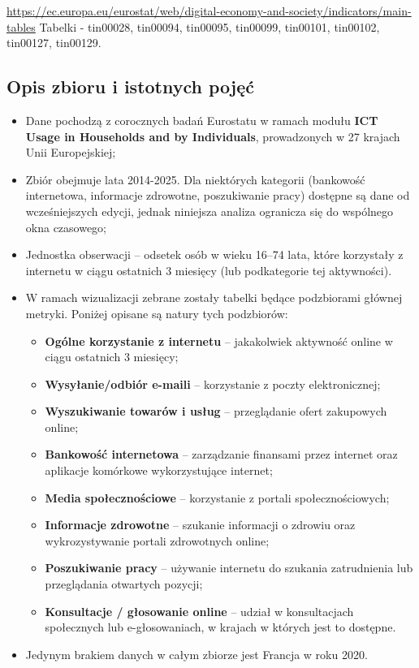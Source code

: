 \documentclass[12pt]{article}
\begin{document}
\url{https://ec.europa.eu/eurostat/web/digital-economy-and-society/indicators/main-tables}
Tabelki - tin00028, tin00094, tin00095, tin00099, tin00101, tin00102, tin00127, tin00129.


\subsection{Opis zbioru i istotnych pojęć}

\begin{itemize}
    \item Dane pochodzą z corocznych badań Eurostatu w ramach modułu \textbf{ICT Usage in Households and by Individuals}, 
    prowadzonych w 27 krajach Unii Europejskiej;
    \item Zbiór obejmuje lata 2014-2025. Dla niektórych kategorii (bankowość internetowa, informacje zdrowotne, poszukiwanie pracy) dostępne są 
    dane od wcześniejszych edycji, jednak niniejsza analiza ogranicza się do wspólnego okna czasowego;
    \item Jednostka obserwacji – odsetek osób w wieku 16--74 lata, które korzystały z internetu w ciągu ostatnich 3 miesięcy 
    (lub podkategorie tej aktywności).

    \item W ramach wizualizacji zebrane zostały tabelki będące podzbiorami głównej metryki. Poniżej opisane są natury tych podzbiorów:
    \begin{itemize}
        \item \textbf{Ogólne korzystanie z internetu} – jakakolwiek aktywność online w ciągu ostatnich 3 miesięcy;
        \item \textbf{Wysyłanie/odbiór e-maili} – korzystanie z poczty elektronicznej;
        \item \textbf{Wyszukiwanie towarów i usług} – przeglądanie ofert zakupowych online;
        \item \textbf{Bankowość internetowa} – zarządzanie finansami przez internet oraz aplikacje komórkowe wykorzystujące internet;
        \item \textbf{Media społecznościowe} – korzystanie z portali społecznościowych;
        \item \textbf{Informacje zdrowotne} – szukanie informacji o zdrowiu oraz wykrozystywanie portali zdrowotnych online;
        \item \textbf{Poszukiwanie pracy} – używanie internetu do szukania zatrudnienia lub przeglądania otwartych pozycji;
        \item \textbf{Konsultacje / głosowanie online} – udział w konsultacjach społecznych lub e-głosowaniach, w krajach w których jest to dostępne.
    \end{itemize}

    \item Jedynym brakiem danych w całym zbiorze jest Francja w roku 2020.
\end{itemize}
\end{document}
